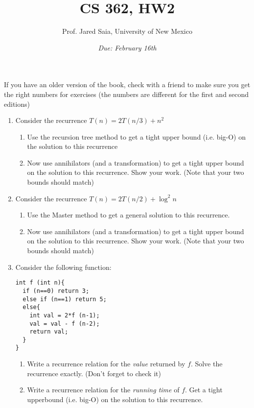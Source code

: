 \documentclass[11pt]{article}
\begin{document}
\title{CS 362, HW2}

\author {Prof. Jared Saia, University of New Mexico}

\date{\emph{Due: February 16th}}
\maketitle

If you have an older version of the book, check with a friend to make
sure you get the right numbers for exercises (the numbers are
different for the first and second editions)

\begin{enumerate}

\item 
Consider the recurrence $T (n) = 2T (n/3) + n^{2}$
\begin{enumerate}
\item Use the recursion tree method to get a tight upper bound
(i.e. big-O) on the solution to this recurrence
\item Now use annihilators (and a transformation) to get a tight upper
bound on the solution to this recurrence.  Show your work.  (Note that
your two bounds should match)
\end{enumerate}

\item 
Consider the recurrence $T (n) = 2T (n/2) + \log^{2} n$
\begin{enumerate}
\item Use the Master method to get a general solution to this
recurrence.
\item Now use annihilators (and a transformation) to get a tight upper
bound on the solution to this recurrence.  Show your work.  (Note that
your two bounds should match)
\end{enumerate}

\item Consider the following function:
\begin{verbatim}
int f (int n){
  if (n==0) return 3;
  else if (n==1) return 5;
  else{
    int val = 2*f (n-1);
    val = val - f (n-2);
    return val;
  }
}
\end{verbatim}

\begin{enumerate}
\item Write a recurrence relation for the \emph{value} returned by
$f$.  Solve the recurrence exactly.  (Don't forget to check it)
\item Write a recurrence relation for the \emph{running time} of $f$.
Get a tight upperbound (i.e. big-O) on the solution to this
recurrence. 
\end{enumerate}


\end{enumerate}
\end{document}
